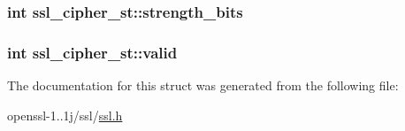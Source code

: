 \hypertarget{structssl__cipher__st_ae3a40fb67452514df7770e334a99c32d}{
\subsubsection[{strength\-\_\-bits}]{\setlength{\rightskip}{0pt plus 5cm}int ssl\-\_\-cipher\-\_\-st\-::strength\-\_\-bits}}\label{structssl__cipher__st_ae3a40fb67452514df7770e334a99c32d}
\hypertarget{structssl__cipher__st_aaf30c2f1483a5dfcf39a507efb2bacf7}{
\subsubsection[{valid}]{\setlength{\rightskip}{0pt plus 5cm}int ssl\-\_\-cipher\-\_\-st\-::valid}}\label{structssl__cipher__st_aaf30c2f1483a5dfcf39a507efb2bacf7}


The documentation for this struct was generated from the following file\-:\begin{DoxyCompactItemize}
\item 
openssl-\/1..\-1j/ssl/\hyperlink{ssl_8h}{ssl.\-h}\end{DoxyCompactItemize}

